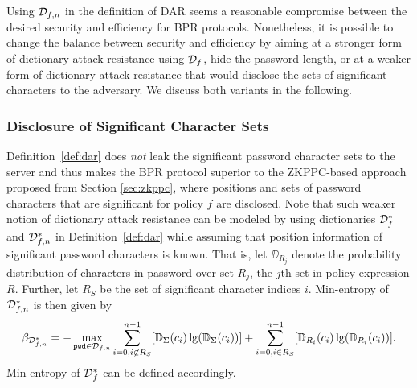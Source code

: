 Using $\mathcal{D}_{f,n}$ in the definition of \ac{DAR} seems a reasonable compromise between the desired security and efficiency for \ac{BPR} protocols.
Nonetheless, it is possible to change the balance between security and efficiency by aiming at a stronger form of dictionary attack resistance using $\mathcal{D}_f$, \ie hide the password length, or at a weaker form of dictionary attack resistance that would disclose the sets of significant characters to the adversary. We discuss both variants in the following.


\subsubsection{Disclosure of Significant Character Sets} %
Definition~\ref{def:dar} does \emph{not} leak the significant password character sets to the server and thus makes the \ac{BPR} protocol superior to the \ac{ZKPPC}-based approach proposed from Section \ref{sec:zkppc}, where positions and sets of password characters that are significant for policy $f$ are disclosed. 
Note that such weaker notion of dictionary attack resistance can be modeled by using dictionaries $\mathcal{D}_{f}^\ast$ and $\mathcal{D}_{f,n}^\ast$ in Definition~\ref{def:dar} while assuming that position information of significant password characters is known. 
That is,
let $\DD_{R_j}$ denote the probability distribution of characters in password \pwd over set $R_j$, the $j$th set in policy expression $R$.
Further, let $R_S$ be the set of significant character indices $i$.
Min-entropy of $\mathcal{D}_{f,n}^\ast$ is then given by
\[\beta_{\mathcal{D}^\ast_{f,n}} = -\max_{\mathtt{pwd}\in \mathcal{D}_{f,n}} \sum_{i=0, i\not\in R_S}^{n-1} [\mathbb{D}_\Sigma(c_i)\lg(\mathbb{D}_\Sigma(c_i))] + \sum_{i=0, i\in R_S}^{n-1} [\mathbb{D}_{R_i}(c_i)\lg(\mathbb{D}_{R_i}(c_i))].\]
Min-entropy of $\mathcal{D}_{f}^\ast$ can be defined accordingly.

